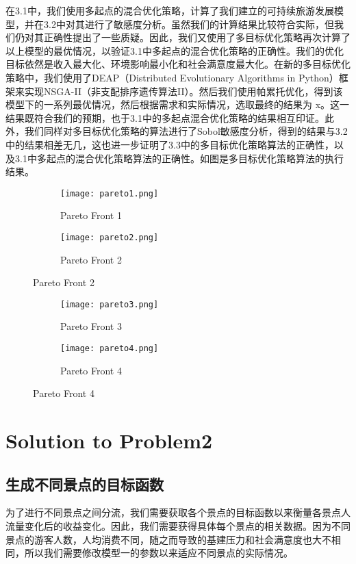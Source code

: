 \documentclass[12pt]{article}  %
\begin{document}
在3.1中，我们使用多起点的混合优化策略，计算了我们建立的可持续旅游发展模型，并在3.2中对其进行了敏感度分析。虽然我们的计算结果比较符合实际，但我们仍对其正确性提出了一些质疑。因此，我们又使用了多目标优化策略再次计算了以上模型的最优情况，以验证3.1中多起点的混合优化策略的正确性。我们的优化目标依然是收入最大化、环境影响最小化和社会满意度最大化。在新的多目标优化策略中，我们使用了DEAP（Distributed Evolutionary Algorithms in Python）框架来实现NSGA-II（非支配排序遗传算法II）。然后我们使用帕累托优化，得到该模型下的一系列最优情况，然后根据需求和实际情况，选取最终的结果为 x。这一结果既符合我们的预期，也于3.1中的多起点混合优化策略的结果相互印证。此外，我们同样对多目标优化策略的算法进行了Sobol敏感度分析，得到的结果与3.2中的结果相差无几，这也进一步证明了3.3中的多目标优化策略算法的正确性，以及3.1中多起点的混合优化策略算法的正确性。如图是多目标优化策略算法的执行结果。

\begin{figure}[htbp]
\centering
\begin{subfigure}[b]{.4\textwidth}
\texttt{[image: pareto1.png]}
\caption{Pareto Front 1}\label{subfig:left1}
\end{subfigure}
\begin{subfigure}[b]{.4\textwidth}
	\texttt{[image: pareto2.png]}
	\caption{Pareto Front 2}\label{subfig:right1}
\end{subfigure}
\end{figure}

\begin{figure}[htbp]
	\centering
	\begin{subfigure}[b]{.4\textwidth}
		\texttt{[image: pareto3.png]}
		\caption{Pareto Front 3}\label{subfig:left2}
	\end{subfigure}
	\begin{subfigure}[b]{.4\textwidth}
		\texttt{[image: pareto4.png]}
		\caption{Pareto Front 4}\label{subfig:right2}
	\end{subfigure}
\end{figure}


\section{Solution to Problem2}
\subsection{生成不同景点的目标函数}
为了进行不同景点之间分流，我们需要获取各个景点的目标函数以来衡量各景点人流量变化后的收益变化。因此，我们需要获得具体每个景点的相关数据。因为不同景点的游客人数，人均消费不同，随之而导致的基建压力和社会满意度也大不相同，所以我们需要修改模型一的参数以来适应不同景点的实际情况。
\end{document}
